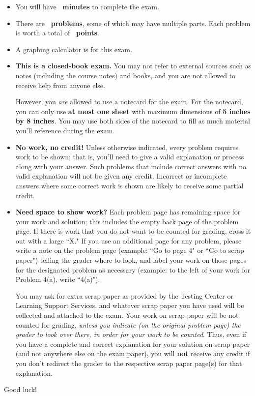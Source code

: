 \begin{tcolorbox}[enhanced,attach boxed title to top center=
	{yshift=-2mm,yshifttext=-1mm},colback=white,colframe=black,colbacktitle=black,title={\textbf{Instructions for the exam}}]
	\begin{itemize}
		\item You will have \textbf{\examtime\ minutes} to complete the exam.
		\item There are \textbf{\examproblemcount\ problems}, some of which may have multiple parts. Each problem is worth a total of \textbf{\examproblemweight\ points}.
		
		\item A graphing calculator is \emph{\graphingcalculator} for this exam.
		\item \textbf{This is a closed-book exam.} You may not refer to external sources such as notes (including the course notes) and books, and you are not allowed to receive help from anyone else.
		
		However, you \emph{are} allowed to use a notecard for the exam. For the notecard, you can only use \textbf{at most one sheet} with maximum dimensions of \textbf{5 inches by 8 inches}. You may use both sides of the notecard to fill as much material you'll reference during the exam.
		\item \textbf{No work, no credit!} Unless otherwise indicated, every problem requires work to be shown; that is, you'll need to give a valid explanation or process along with your answer. Such problems that include correct answers with no valid explanation will not be given any credit. Incorrect or incomplete answers where some correct work is shown are likely to receive some partial credit.
		\item \textbf{Need space to show work?} Each problem page has remaining space for your work and solution; this includes the empty back page of the problem page. If there is work that you do not want to be counted for grading, cross it out with a large ``X." If you use an additional page for any problem, please write a note on the problem page (example: ``Go to page 4" or ``Go to scrap paper") telling the grader where to look, and label your work on those pages for the designated problem as necessary (example: to the left of your work for Problem 4(a), write ``4(a)").
		
		You may ask for extra scrap paper as provided by the Testing Center or Learning Support Services, and whatever scrap paper you have used will be collected and attached to the exam. Your work on scrap paper will be not counted for grading, \emph{unless you indicate (on the original problem page) the grader to look over there, in order for your work to be counted}. Thus, even if you have a complete and correct explanation for your solution on scrap paper (and not anywhere else on the exam paper), you will \textbf{not} receive any credit if you don't redirect the grader to the respective scrap paper page(s) for that explanation.
	\end{itemize}
	\centering \Large{Good luck!} 
	\vspace*{1em}
\end{tcolorbox}